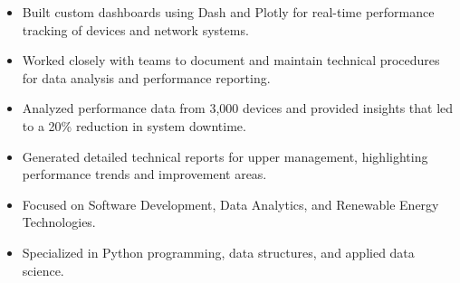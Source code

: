 \par\smallskip
\noindent
\begin{minipage}{20cm}
  \begin{minipage}{9.75cm}
    \begin{itemize}
      \item Built custom dashboards using Dash and Plotly for real-time performance tracking of devices and network systems.
      \item Worked closely with teams to document and maintain technical procedures for data analysis and performance reporting.
    \end{itemize}
  \end{minipage}
  \hfill
  \begin{minipage}{9.75cm}
    \begin{itemize}
      \item Analyzed performance data from 3,000 devices and provided insights that led to a 20\% reduction in system downtime.
      \item Generated detailed technical reports for upper management, highlighting performance trends and improvement areas.
    \end{itemize}
  \end{minipage}
\end{minipage}
\par\smallskip
\divider

\begin{itemize}
  \item Focused on Software Development, Data Analytics, and Renewable Energy Technologies.
\end{itemize}
\divider

\begin{itemize}
  \item Specialized in Python programming, data structures, and applied data science.
\end{itemize}

\noindent
\begin{minipage}{20cm}
\end{minipage}


